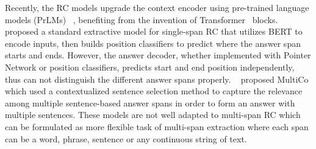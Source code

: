 \documentclass[a4paper,fleqn,twocolumn]{cas-dc}
\newcommand{\1}[1]{\mathds{1}\left[#1\right]}
\begin{document}
Recently, the RC models upgrade the context encoder using pre-trained language models (PrLMs)~\citep{radford2018improving,kenton2019bert,liu2019roberta,lee2020biobert,gu2021domain} 
, benefiting from the invention of Transformer~\citep{vaswani2017attention} blocks.
\cite{DBLP:conf/naacl/DevlinCLT19}  proposed a standard extractive model for  single-span RC that utilizes BERT to encode inputs, then builds position classifiers to predict where the answer span starts and ends.
However, the answer decoder, whether implemented with Pointer Network or position classifiers, predicts start and end position independently, thus can not distinguish the different answer spans properly.
~\cite{DBLP:conf/emnlp/ZhuAJ0R20} proposed MultiCo which used a contextualized sentence selection method to capture the relevance among multiple sentence-based answer spans in order to form an answer with multiple sentences.
These models are not well adapted to multi-span RC which can be formulated as more flexible task of multi-span extraction where each span can be a word, phrase, sentence or any continuous string of text.
\end{document}
